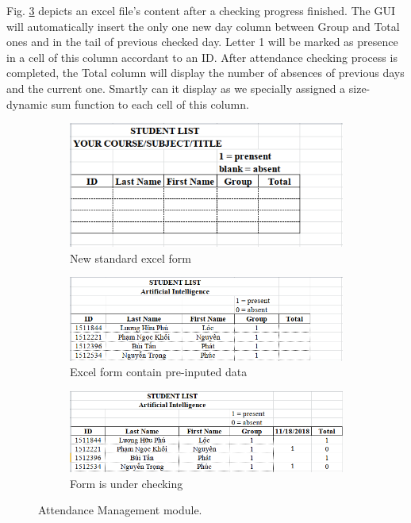 \documentclass[journal, twocolumn]{IEEEtran}
\begin{document}
Fig. \ref{fig:form-checked} depicts an excel file's content after a checking progress finished. 
The GUI will automatically insert the only one new day column between Group and Total ones and in the tail of previous checked day. 
Letter 1 will be marked as presence in a cell of this column accordant to an ID. 
After attendance checking process is completed, the Total column will display the number of absences of previous days and the current one. Smartly can it display as we specially assigned a size-dynamic sum function to each cell of this column.


\begin{figure}
  \centering
  \begin{subfigure}[b]{\linewidth}
  	\centering
    \includegraphics[width=0.8\linewidth]{img/form-new.png}
	\caption{New standard excel form}
	\label{fig:form-new}
  \end{subfigure}
  
  \hspace{3mm}
  
  \centering
  \begin{subfigure}[b]{\linewidth}
  	\centering
    \includegraphics[width=0.8\linewidth]{img/form-data.png}
	\caption{Excel form contain pre-inputed data}
	\label{fig:form-data}
  \end{subfigure}
  
  \hspace{3mm}
  
  \centering
  \begin{subfigure}[b]{\linewidth}
  	\centering
    \includegraphics[width=0.8\linewidth]{img/form-checked.png}
	\caption{Form is under checking}
	\label{fig:form-checked}
  \end{subfigure}
  
  \caption{Attendance Management module.}
  \label{fig:attendace-management-module}
\end{figure}
\end{document}
